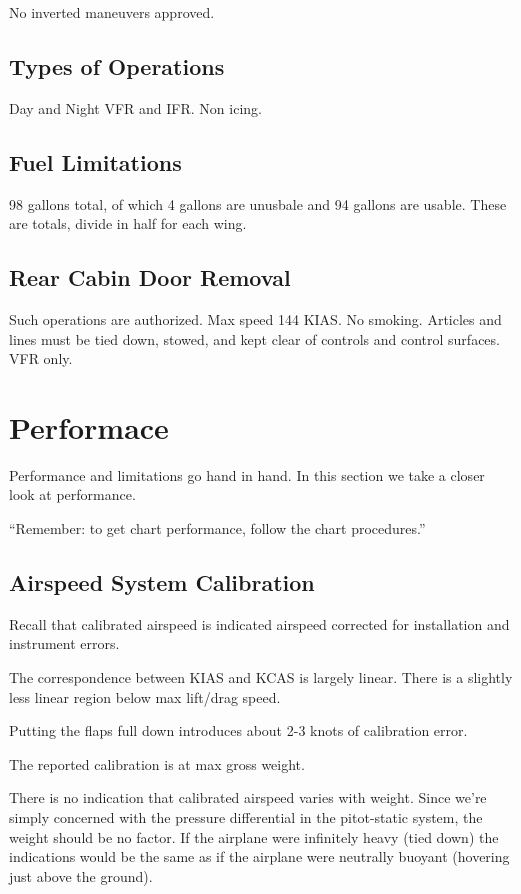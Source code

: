No inverted maneuvers approved.

\subsection{Types of Operations}

Day and Night VFR and IFR. Non icing.

\subsection{Fuel Limitations}

98 gallons total, of which 4 gallons are unusbale and 94 gallons are usable. These are totals, divide in half for each wing.

\subsection{Rear Cabin Door Removal}

Such operations are authorized. Max speed 144 KIAS. No smoking. Articles and lines must be tied down, stowed, and kept clear of controls and control surfaces. VFR only.


\section{Performace}

Performance and limitations go hand in hand. In this section we take a closer look at performance.

``Remember: to get chart performance, follow the chart procedures.''

\subsection{Airspeed System Calibration}

Recall that calibrated airspeed is indicated airspeed corrected for installation and instrument errors.

The correspondence between KIAS and KCAS is largely linear. There is a slightly less linear region below max lift/drag speed.

Putting the flaps full down introduces about 2-3 knots of calibration error.

The reported calibration is at max gross weight.

There is no indication that calibrated airspeed varies with weight. Since we're simply concerned with the pressure differential in the pitot-static system, the weight should be no factor. If the airplane were infinitely heavy (tied down) the indications would be the same as if the airplane were neutrally buoyant (hovering just above the ground).

